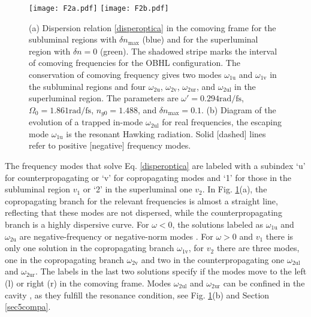 \documentclass[aps,pra,reprint,amsmath,amssymb,showpacs,groupedaddress,floatfix]{revtex4-1}
\begin{document}
\begin{figure}
	\centering
	\texttt{[image: F2a.pdf]}\hspace{1mm}
	\texttt{[image: F2b.pdf]}
	\caption{(a) Dispersion relation \eqref{disperoptica} in the comoving frame for the subluminal regions with $\delta n_\text{max}$ (blue) and for the superluminal region with $\delta n=0$ (green). The shadowed stripe marks the interval of comoving frequencies for the OBHL configuration. The conservation of comoving frequency gives two modes $\omega_{\text{1u}}$ and $\omega_{\text{1v}}$ in the subluminal regions and four $\omega_{\text{2u}}$, $\omega_{\text{2v}}$, $\omega_{\text{2ur}}$, and $\omega_{\text{2ul}}$ in the superluminal region. The parameters are $\omega'=0.294\text{rad/fs}$, $\Omega_0=1.861\text{rad/fs}$, $n_{g0}=1.488$, and $\delta n_\text{max}=0.1$. (b) Diagram of the evolution of a trapped in-mode $\omega_{2\text{ul}}$ for real frequencies, the escaping mode $\omega_\text{1u}$ is the resonant Hawking radiation. Solid [dashed] lines refer to positive [negative] frequency modes.}
	\label{fig2disp}
\end{figure}

The frequency modes that solve Eq. \eqref{disperoptica} are labeled with a subindex `u' for counterpropagating or `v' for copropagating modes and `1' for those in the subluminal region $v_1$ or `2' in the superluminal one $v_2$. In Fig. \ref{fig2disp}(a), the copropagating branch for the relevant frequencies is almost a straight line, reflecting that these modes are not dispersed, while the counterpropagating branch is a highly dispersive curve. For $\omega<0$, the solutions labeled as $\omega_\text{1u}$ and $\omega_\text{2u}$ are negative-frequency or negative-norm modes \cite{Robertson2011}. For $\omega>0$ and $v_1$ there is only one solution in the copropagating branch $\omega_\text{1v}$, for $v_2$ there are three modes, one in the copropagating branch $\omega_\text{2v}$ and two in the counterpropagating one $\omega_\text{2ul}$ and $\omega_\text{2ur}$. The labels in the last two solutions specify if the modes move to the left (l) or right (r) in the comoving frame. Modes $\omega_\text{2ul}$ and $\omega_\text{2ur}$ can be confined in the cavity \cite{Leonhardt2007}, as they fulfill the resonance condition, see Fig. \ref{fig2disp}(b) and Section \ref{sec5compa}.
\end{document}
